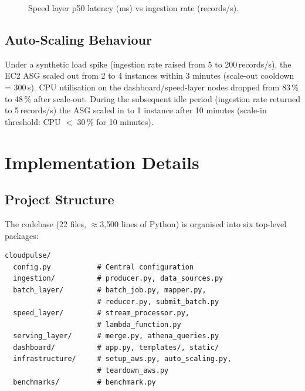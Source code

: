 \documentclass[conference]{IEEEtran}
\begin{document}
\begin{figure}[ht]
\centering
{}
\caption{Speed layer p50 latency (ms) vs ingestion rate (records/s).}
\label{fig:latency}
\end{figure}

\subsection{Auto-Scaling Behaviour}

Under a synthetic load spike (ingestion rate raised from 5 to 200\,records/s),
the EC2 ASG scaled out from 2 to 4 instances within 3 minutes (scale-out
cooldown = 300\,s). CPU utilisation on the dashboard/speed-layer nodes dropped
from 83\,\% to 48\,\% after scale-out. During the subsequent idle period
(ingestion rate returned to 5\,records/s) the ASG scaled in to 1 instance after
10 minutes (scale-in threshold: CPU $<$ 30\,\% for 10 minutes).

\section{Implementation Details}

\subsection{Project Structure}

The codebase (22 files, $\approx$3{,}500 lines of Python) is organised into six
top-level packages:

\begin{lstlisting}
cloudpulse/
  config.py           # Central configuration
  ingestion/          # producer.py, data_sources.py
  batch_layer/        # batch_job.py, mapper.py,
                      # reducer.py, submit_batch.py
  speed_layer/        # stream_processor.py,
                      # lambda_function.py
  serving_layer/      # merge.py, athena_queries.py
  dashboard/          # app.py, templates/, static/
  infrastructure/     # setup_aws.py, auto_scaling.py,
                      # teardown_aws.py
  benchmarks/         # benchmark.py
\end{lstlisting}
\end{document}

